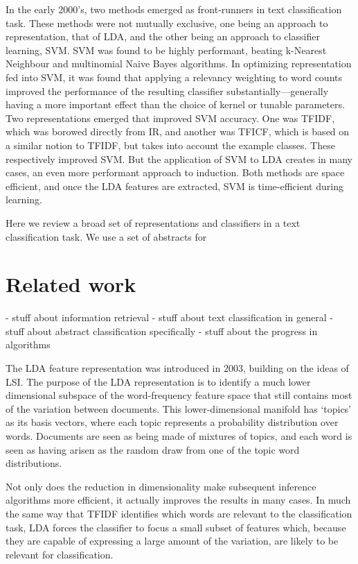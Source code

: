 \documentclass[conference,letterpaper]{IEEEtran}
\begin{document}
In the early 2000's, two methods emerged as front-runners in text 
classification task.  These methods were not mutually exclusive, one being
an approach to representation, that of LDA, and the other being an approach
to classifier learning, SVM.  SVM was found to be 
highly performant, beating k-Nearest Neighbour and multinomial Naive Bayes
algorithms.  In optimizing representation fed into SVM, it was found that
applying a relevancy weighting to word counts improved the performance of
the resulting classifier substantially---generally having a more important
effect than the choice of kernel or tunable parameters.  Two representations
emerged that improved SVM accuracy.  One was TFIDF, which was borowed 
directly from IR, and another was TFICF, which is based on a similar notion
to TFIDF, but takes into account the example classes.  These respectively 
improved SVM.  But the application of SVM to LDA creates in many cases,
an even more performant approach to induction.  Both methods are space
efficient, and once the LDA features are extracted, SVM is time-efficient
during learning.


Here we review a broad set of representations and classifiers in a text
classification task.  We use a set of abstracts for 
\section{Related work}
- stuff about information retrieval
- stuff about text classification in general
- stuff about abstract classification specifically
- stuff about the progress in algorithms


The LDA feature representation was introduced in 2003, building on the
ideas of LSI.  The purpose of the LDA representation is to identify a 
much lower dimensional subspace of the word-frequency feature space that still 
contains most of the variation between documents.  This lower-dimensional
manifold has `topics' as its basis vectors, where each topic represents a 
probability distribution over words.  Documents are seen as being made of
mixtures of topics, and each word is seen as having arisen as the random
draw from one of the topic word distributions.

Not only does the reduction in dimensionality make subsequent inference
algorithms more efficient, it actually improves the results in many cases.
In much the same way that TFIDF identifies which words are relevant to the
classification task, LDA forces the classifier to focus a small subset of
features which, because they are capable of expressing a large amount of the 
variation, are likely to be relevant for classification.
\end{document}
